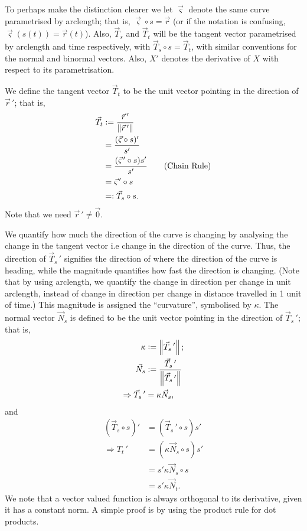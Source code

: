 \documentclass{article}
\theoremstyle{definition}
\begin{document}
To perhaps make the distinction clearer we let $\vec\varsigma$ denote the same curve parametrised by arclength; that is, $\vec\varsigma\circ s=\vec r$ (or if the notation is confusing, $\vec\varsigma(s(t))=\vec r(t)$). Also, $\vec T_s$ and $\vec T_t$ will be the tangent vector parametrised by arclength and time respectively, with $\vec T_s\circ s=\vec T_t$, with similar conventions for the normal and binormal vectors. Also, $X'$ denotes the derivative of $X$ with respect to its parametrisation.\par

We define the tangent vector $\vec T_t$ to be the unit vector pointing in the direction of $\vec r\,'$; that is,
\begin{align*}
	\vec T_t&\vcentcolon=\frac{\vec r\,'}{\left\lVert\vec r\,'\right\rVert}\\
	&=\frac{(\vec\varsigma\circ s)'}{s'}\\
	&=\frac{(\vec\varsigma\,'\circ s)s'}{s'}\tag*{(Chain Rule)}\\
	&=\vec\varsigma\,'\circ s\\
	&=\vcentcolon\vec T_s\circ s.
\end{align*}
Note that we need $\vec r\,'\not=\vec0$.

We quantify how much the direction of the curve is changing by analysing the change in the tangent vector i.e change in the direction of the curve. Thus, the direction of $\vec T_s\,'$ signifies the direction of where the direction of the curve is heading, while the magnitude quantifies how fast the direction is changing. (Note that by using arclength, we quantify the change in direction per change in unit arclength, instead of change in direction per change in distance travelled in 1 unit of time.) This magnitude is assigned the ``curvature'', symbolised by $\kappa$. The normal vector $\vec N_s$ is defined to be the unit vector pointing in the direction of $\vec T_s\,'$; that is,
\begin{align*}
	\kappa&\vcentcolon=\left\lVert\vec T_s\,'\right\rVert;\\
	\vec N_s&\vcentcolon=\frac{\vec T_s\,'}{\left\lVert\vec T_s\,'\right\rVert}\\
	\Rightarrow\vec T_s\,'&=\kappa \vec N_s,
\end{align*}
and
\begin{align*}
	(\vec T_s\circ s)'&=(\vec T_s\,'\circ s)s'\\
	\Rightarrow T_t\,'&=(\kappa \vec N_s\circ s)s'\\
	&=s'\kappa \vec N_s\circ s\\
	&=s'\kappa \vec N_t.
\end{align*}
We note that a vector valued function is always orthogonal to its derivative, given it has a constant norm. A simple proof is by using the product rule for dot products.\par
\end{document}
